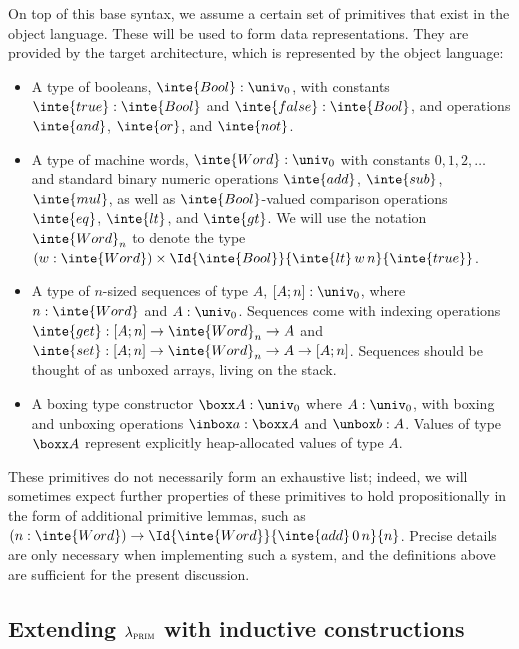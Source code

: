 On top of this base syntax, we assume a certain set of primitives that exist in
the object language. These will be used to form data representations. They are
provided by the target architecture, which is represented by the object
language:
\begin{itemize}
  \item A type of booleans, $\inte{Bool} : \univ_0$, with constants $\inte{true} :
          \inte{Bool}$ and $\inte{false} : \inte{Bool}$, and operations $\inte{and}$,
        $\inte{or}$, and $\inte{not}$.
  \item A type of machine words, $\inte{Word} : \univ_0$ with constants $0, 1, 2,
          \ldots$ and standard binary numeric operations $\inte{add}$, $\inte{sub}$,
        $\inte{mul}$, as well as $\inte{Bool}$-valued comparison operations
        $\inte{eq}$, $\inte{lt}$, and $\inte{gt}$. We will use the notation
        $\inte{Word}_n$ to denote the type $(w : \inte{Word}) \times
          \Id{\inte{Bool}}{\inte{lt} \, w \, n}{\inte{true}}$.
  \item A type of $n$-sized sequences of type $A$, $\seq{A}{n} : \univ_0$, where $n :
          \inte{Word}$ and $A : \univ_0$. Sequences come with indexing operations
        $\inte{get} : \seq{A}{n} \to \inte{Word}_n \to A$ and $\inte{set} : \seq{A}{n}
          \to \inte{Word}_n \to A \to \seq{A}{n}$. Sequences should be thought of as
        unboxed arrays, living on the stack.
  \item A boxing type constructor $\boxx A : \univ_0$ where $A : \univ_0$, with boxing
        and unboxing operations $\inbox a : \boxx A$ and $\unbox b : A$. Values of type
        $\boxx A$ represent explicitly heap-allocated values of type $A$.
\end{itemize}
These primitives do not necessarily form an exhaustive list; indeed, we will
sometimes expect further properties of these primitives to hold propositionally
in the form of additional primitive lemmas, such as
$(n : \inte{Word}) \to \Id{\inte{Word}}{\inte{add}\,0\,n}{n}$. Precise details are only necessary when
implementing such a system, and the definitions above are sufficient for the
present discussion.

\subsection{Extending $\lambda_{\textsc{prim}}$ with inductive constructions}

\newcommand{\lab}[1]{{\color{blue}{\textsf{#1}}}}

